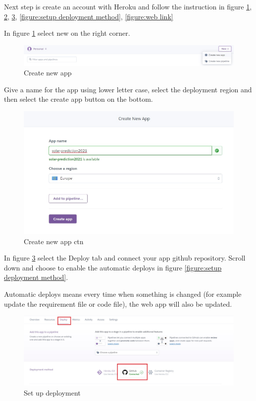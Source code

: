 Next step is create an account with Heroku and follow the instruction in figure \ref{figure:Create new app}, \ref{figure:Create new app ctn}, \ref{figure:setup deployment}, \ref{figure:setup deployment method}, \ref{figure:web link}

In figure \ref{figure:Create new app} select new on the right corner.

\begin{figure}[H]
	\centering
    \includegraphics[width=0.8\columnwidth]{Pictures/Heroku_newapp.jpg}
	\caption[Short title]{Create new app}
	\label{figure:Create new app}
\end{figure}

Give a name for the app using lower letter case, select the deployment region and then select the create app button on the bottom.

\begin{figure}[H]
	\centering
    \includegraphics[width=0.8\columnwidth]{Pictures/Heroku_app.jpg}
	\caption[Short title]{Create new app ctn}
	\label{figure:Create new app ctn}
\end{figure}

In figure \ref{figure:setup deployment} select the Deploy tab and connect your app github repository. Scroll down and choose to enable the automatic deploys in figure \ref{figure:setup deployment method}.

Automatic deploys means every time when something is changed (for example update the requirement file or code file), the web app will also be updated. 

\begin{figure}[H]
	\centering
    \includegraphics[width=0.8\columnwidth]{Pictures/Heroku_Deployment_setting.jpg}
	\caption[Short title]{Set up deployment}
	\label{figure:setup deployment}
\end{figure}

